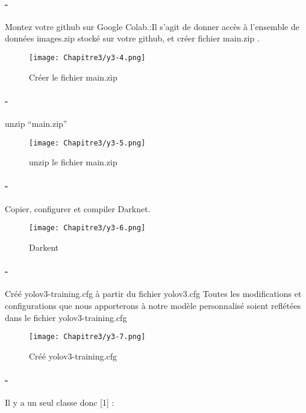          \paragraph{-} Montez votre github sur Google Colab.:Il s'agit de donner accès à l'ensemble de données images.zip stocké sur  votre github, et créer fichier main.zip .  
         \begin{figure}[H]
               \centering
               \texttt{[image: Chapitre3/y3-4.png]}
               \caption{ Créer le fichier main.zip}
               \label{y3-4}
               \end{figure} 
          
      \paragraph{-} unzip “main.zip” 
      \begin{figure}[H]
           \centering
           \texttt{[image: Chapitre3/y3-5.png]}
           \caption{ unzip le fichier main.zip}
           \label{y3-5}
           \end{figure} 
          
      \paragraph{-}  Copier, configurer et compiler Darknet.
      \begin{figure}[H]
           \centering
           \texttt{[image: Chapitre3/y3-6.png]}
           \caption{Darkent}
           \label{y3-6}
           \end{figure}  

      \paragraph{-} Créé  yolov3-training.cfg à partir du fichier yolov3.cfg Toutes les modifications et configurations que nous apporterons à notre modèle personnalisé soient reflétées dans le fichier yolov3-training.cfg
      \begin{figure}[H]
           \centering
           \texttt{[image: Chapitre3/y3-7.png]}
           \caption{Créé  yolov3-training.cfg}
           \label{y3-7}
           \end{figure}
      \paragraph{-}  Il y a un seul classe donc [1] : 

